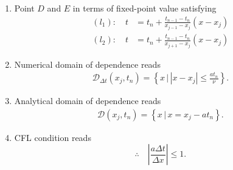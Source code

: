 \documentclass[12pt]{article}
\begin{document}
\begin{enumerate}
	\item Point $D$ and $E$ in terms of fixed-point value satisfying
	      \begin{align}
		      (l_1):\quad t & = t_n + \frac{t_{n-1}-t_n}{x_{j-1}-x_j}\left(x-x_{j}\right) \\
		      (l_2):\quad t & = t_n + \frac{t_{n-1}-t_n}{x_{j+1}-x_j}\left(x-x_{j}\right)
	      \end{align}
	\item Numerical domain of dependence reads
	      \begin{align}
		      \mathcal{D}_{\Delta t}\left(x_j,t_n\right)
		      =  \left\{ x \, \Big|\, \left| x - x_j \right| \leq \frac{at_n}{\nu} \right\}.
	      \end{align}
	      
	\item Analytical domain of dependence reads
	      \begin{align}
		      \mathcal{D}\left(x_j,t_n\right)
		      =  \left\{ x \, \Big|\, x = x_{j} - at_n \right\} .
	      \end{align}
	      
	\item CFL condition reads
	      \begin{equation}
		      \therefore\quad
		      \boxed{
			      \left| \frac{a \Delta t}{\Delta x} \right| \leq 1.
		      }
	      \end{equation}
\end{enumerate}

\pagebreak
\end{document}
